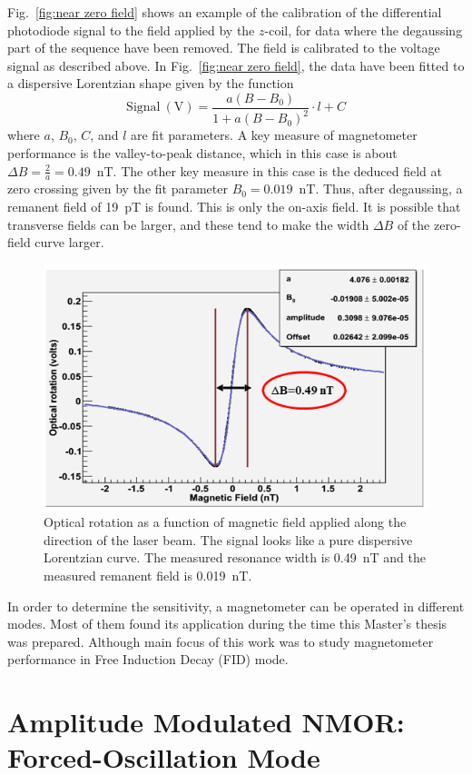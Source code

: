 Fig.~\ref{fig:near zero field} shows an example of the calibration of
the differential photodiode signal to the field applied by the
$z$-coil, for data where the degaussing part of the sequence have been
removed.  The field is calibrated to the voltage signal as described
above.  In Fig.~\ref{fig:near zero field}, the data have been fitted
to a dispersive Lorentzian shape given by the function
\begin{equation}
\mathrm{Signal~(V)}=\frac{a(B-B_0)}{1+a(B-B_0)^2}\cdot l+C
\end{equation}
where $a$, $B_0$, $C$, and $l$ are fit parameters.  A key measure of
magnetometer performance is the valley-to-peak distance, which in this
case is about $\Delta B=\frac{2}{a}=0.49$~nT.  The other key measure
in this case is the deduced field at zero crossing given by the fit
parameter $B_0=0.019$~nT.  Thus, after degaussing, a remanent field of
19~pT is found.  This is only the on-axis field.  It is possible that
transverse fields can be larger, and these tend to make the width
$\Delta B$ of the zero-field curve larger.

\begin{figure}[h]
\centering\includegraphics[width=0.7\linewidth]{figures/near_zero_field}
\caption{Optical rotation as a function of magnetic field applied
  along the direction of the laser beam. The signal looks like a pure
  dispersive Lorentzian curve. The measured resonance width is 0.49~nT
  and the measured remanent field is 0.019~nT.\label{fig:near zero
    field}}
\end{figure}

In order to determine the sensitivity, a magnetometer can be operated
in different modes. Most of them found its application during the time
this Master's thesis was prepared. Although main focus of this work
was to study magnetometer performance in Free Induction Decay (FID)
mode.

\section{Amplitude Modulated NMOR:  Forced-Oscillation Mode}


